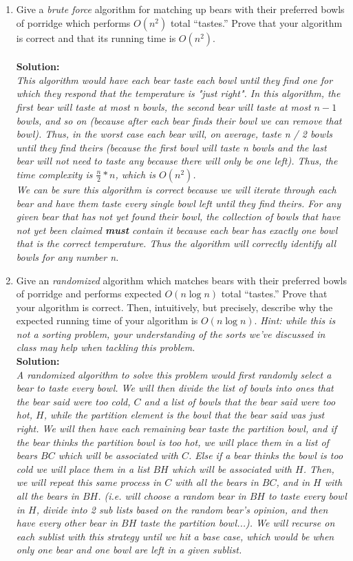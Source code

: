 \documentclass[10pt]{article}
\begin{document}
\begin{enumerate}
    \item Give a {\em brute force} algorithm for matching up bears with their preferred bowls of porridge which performs $O(n^2)$ total ``tastes.'' Prove that your algorithm is correct and that its running time is $O(n^2)$. \\ \\
    \textbf{Solution:} \\
    \emph{
        This algorithm would have each bear taste each bowl until they find one for which they respond that the temperature is "just right". In this algorithm, the first bear will taste at most n bowls, the second bear will taste at most $n - 1$ bowls, and so on (because after each bear finds their bowl we can remove that bowl). Thus, in the worst case each bear will, on average, taste n / 2 bowls until they find theirs (because the first bowl will taste n bowls and the last bear will not need to taste any because there will only be one left). Thus, the time complexity is $\frac{n}{2} * n$, which is $O(n^2)$. \\
        We can be sure this algorithm is correct because we will iterate through each bear and have them taste every single bowl left until they find theirs. For any given bear that has not yet found their bowl, the collection of bowls that have not yet been claimed \textbf{must} contain it because each bear has exactly one bowl that is the correct temperature. Thus the algorithm will correctly identify all bowls for any number n.
    }
    \item Give an {\em randomized} algorithm which matches bears with their preferred bowls of porridge and performs expected $O(n \log n)$ total ``tastes.'' Prove that your algorithm is correct. Then, intuitively, but precisely, describe why the expected running time of your algorithm is $O(n \log n)$. {\em Hint: while this is not a sorting problem, your understanding of the sorts we've discussed in class may help when tackling this problem.} \\
    \textbf{Solution:} \\
    \emph{
    A randomized algorithm to solve this problem would first randomly select a bear to taste every bowl. We will then divide the list of bowls into ones that the bear said were too cold, $C$ and a list of bowls that the bear said were too hot, $H$, while the partition element is the bowl that the bear said was just right. We will then have each remaining bear taste the partition bowl, and if the bear thinks the partition bowl is too hot, we will place them in a list of bears $BC$ which will be associated with $C$. Else if a bear thinks the bowl is too cold we will place them in a list $BH$ which will be associated with $H$. Then, we will repeat this same process in $C$ with all the bears in $BC$, and in $H$ with all the bears in $BH$. (i.e. will choose a random bear in $BH$ to taste every bowl in $H$, divide into 2 sub lists based on the random bear's opinion, and then have every other bear in $BH$ taste the partition bowl...). We will recurse on each sublist with this strategy until we hit a base case, which would be when only one bear and one bowl are left in a given sublist. \\
}
\end{enumerate}
\end{document}
